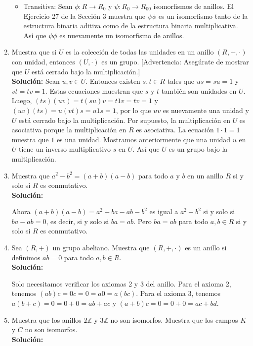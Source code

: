 \begin{enumerate}
\begin{itemize}
		\item Transitiva: Sean $\phi: R \to R_0$ y $\psi: R_0 \to R_{00}$ isomorfismos de anillos. El Ejercicio 27 de la Sección 3 muestra que $\psi\phi$ es un isomorfismo tanto de la estructura binaria aditiva como de la estructura binaria multiplicativa. Así que $\psi\phi$ es nuevamente un isomorfismo de anillos.
	\end{itemize}
	\item Muestra que si $U$ es la colección de todas las unidades en un anillo $(R, +, \cdot)$ con unidad, entonces $(U, \cdot)$ es un grupo. [Advertencia: Asegúrate de mostrar que $U$ está cerrado bajo la multiplicación.]
	\\ \textbf{Solución:}
	Sean $u, v \in U$. Entonces existen $s, t \in R$ tales que $us = su = 1$ y $vt = tv = 1$. Estas ecuaciones muestran que $s$ y $t$ también son unidades en $U$. Luego, $(ts)(uv) = t(su)v = t1v = tv = 1$ y $(uv)(ts) = u(vt)s = u1s = 1$, por lo que $uv$ es nuevamente una unidad y $U$ está cerrado bajo la multiplicación. Por supuesto, la multiplicación en $U$ es asociativa porque la multiplicación en $R$ es asociativa. La ecuación $1 \cdot 1 = 1$ muestra que $1$ es una unidad. Mostramos anteriormente que una unidad $u$ en $U$ tiene un inverso multiplicativo $s$ en $U$. Así que $U$ es un grupo bajo la multiplicación.
	
	\item Muestra que $a^2 - b^2 = (a + b)(a - b)$ para todo $a$ y $b$ en un anillo $R$ si y solo si $R$ es conmutativo.
	\\ \textbf{Solución:}
	
	Ahora $(a + b)(a - b) = a^2 + ba - ab - b^2$ es igual a $a^2 - b^2$ si y solo si $ba - ab = 0$, es decir, si y solo si $ba = ab$. Pero $ba = ab$ para todo $a, b \in R$ si y solo si $R$ es conmutativo.
	
	\item  Sea $(R, +)$ un grupo abeliano. Muestra que $(R, +, \cdot)$ es un anillo si definimos $ab = 0$ para todo $a, b \in R$.
	\\ \textbf{Solución:}
	
	Solo necesitamos verificar los axiomas 2 y 3 del anillo. Para el axioma 2, tenemos $(ab)c = 0c = 0 = a0 = a(bc)$. Para el axioma 3, tenemos $a(b + c) = 0 = 0 + 0 = ab + ac$ y $(a + b)c = 0 = 0 + 0 = ac + bd$.
	
	\item Muestra que los anillos $2\mathbb{Z}$ y $3\mathbb{Z}$ no son isomorfos. Muestra que los campos $K$ y $C$ no son isomorfos.
	\\ \textbf{Solución:}
	

\end{enumerate}

